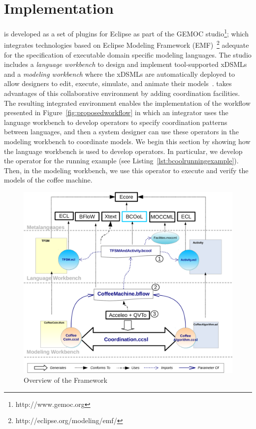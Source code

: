 \section{Implementation}
\label{section:bcoollengbench}

\bcool is developed as a set of plugins for Eclipse as part of the GEMOC studio\footnote{http://www.gemoc.org}; which integrates technologies based on Eclipse Modeling Framework (EMF)~\footnote{http://eclipse.org/modeling/emf/} adequate for the specification of executable domain specific modeling languages. The studio includes a \emph{language workbench} to design and implement tool-supported xDSMLs and a \emph{modeling workbench} where the xDSMLs are automatically deployed to allow designers to edit, execute, simulate, and animate their models~\cite{ttc15bib}. \bcool takes advantages of this collaborative environment by adding coordination facilities. The resulting integrated environment enables the implementation of the workflow presented in Figure~\ref{fig:proposedworkflow} in which an integrator uses the language workbench to develop \bcool operators to specify coordination patterns between languages, and then a system designer can use these operators in the modeling workbench to  coordinate models. We begin this section by showing how the language workbench is used to develop \bcool operators. In particular, we develop the operator for the running example (see Listing~\ref{lst:bcoolrunningexample}). Then, in the modeling workbench, we use this operator to execute and verify the models of the coffee machine. 

\begin{figure}[h]
	\begin{center}
		\includegraphics[width=1\textwidth]{bcool/figs/bcooltechnos}
		\caption{Overview of the \bcool Framework}
		\label{fig:bcooltechnos}
	\end{center}
\end{figure}

